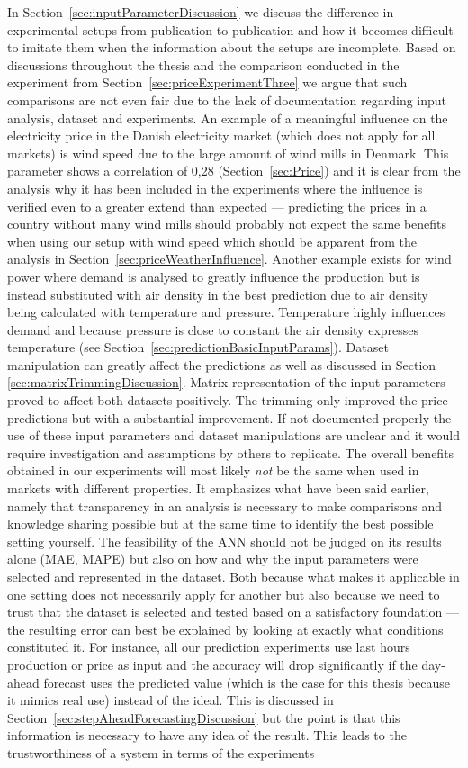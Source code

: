 In Section~\ref{sec:inputParameterDiscussion} we discuss the difference in experimental setups from publication to publication and how it becomes difficult to imitate them when the information about the setups are incomplete. Based on discussions throughout the thesis and the comparison conducted in the experiment from Section~\ref{sec:priceExperimentThree} we argue that such comparisons are not even fair due to the lack of documentation regarding input analysis, dataset and experiments. An example of a meaningful influence on the electricity price in the Danish electricity market (which does not apply for all markets) is wind speed due to the large amount of wind mills in Denmark. This parameter shows a correlation of 0,28 (Section~\ref{sec:Price}) and it is clear from the analysis why it has been included in the experiments where the influence is verified even to a greater extend than expected --- predicting the prices in a country without many wind mills should probably not expect the same benefits when using our setup with wind speed which should be apparent from the analysis in Section~\ref{sec:priceWeatherInfluence}. Another example exists for wind power where demand is analysed to greatly influence the production but is instead substituted with air density in the best prediction due to air density being calculated with temperature and pressure. Temperature highly influences demand and because pressure is close to constant the air density expresses temperature (see Section~\ref{sec:predictionBasicInputParams}). Dataset manipulation can greatly affect the predictions as well as discussed in Section \ref{sec:matrixTrimmingDiscussion}. Matrix representation of the input parameters proved to affect both datasets positively. The trimming only improved the price predictions but with a substantial improvement. If not documented properly the use of these input parameters and dataset manipulations are unclear and it would require investigation and assumptions by others to replicate. The overall benefits obtained in our experiments will most likely \emph{not} be the same when used in markets with different properties. It emphasizes what have been said earlier, namely that transparency in an analysis is necessary to make comparisons and knowledge sharing possible but at the same time to identify the best possible setting yourself. The feasibility of the ANN should not be judged on its results alone (MAE, MAPE) but also on how and why the input parameters were selected and represented in the dataset. Both because what makes it applicable in one setting does not necessarily apply for another but also because we need to trust that the dataset is selected and tested based on a satisfactory foundation --- the resulting error can best be explained by looking at exactly what conditions constituted it. For instance, all our prediction experiments use last hours production or price as input and the accuracy will drop significantly if the day-ahead forecast uses the predicted value (which is the case for this thesis because it mimics real use) instead of the ideal. This is discussed in Section~\ref{sec:stepAheadForecastingDiscussion} but the point is that this information is necessary to have any idea of the result. This leads to the trustworthiness of a system in terms of the experiments 